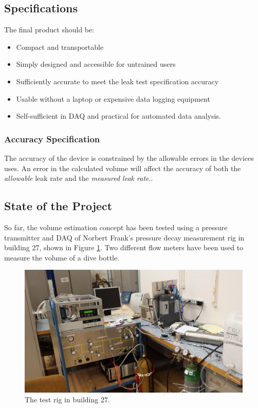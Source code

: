 \documentclass{report}
\begin{document}
\subsection{Specifications}
The final product should be:

\begin{itemize}
	\item{Compact and transportable}
	\item{Simply designed and accessible for untrained users}
	\item{Sufficiently accurate to meet the leak test specification accuracy}
	\item{Usable without a laptop or expensive data logging equipment}
	\item{Self-sufficient in DAQ and practical for automated data analysis.}
\end{itemize}

\subsubsection{Accuracy Specification}
The accuracy of the device is constrained by the allowable errors in the devices uses. An error in the calculated volume will affect the accuracy of both the \textit{allowable} leak rate and the \textit{measured leak rate}.\cite{leakPaola}.
	
\subsection{State of the Project}
So far, the volume estimation concept has been tested using a pressure transmitter and DAQ of Norbert Frank's pressure decay measurement rig in building 27, shown in Figure \ref{b27}. Two different flow meters have been used to measure the volume of a dive bottle. 
\begin{figure}[h]
\includegraphics[width = \textwidth]{wide}
\caption{The test rig in building 27.}
\label{b27}
\end{figure}
\end{document}
